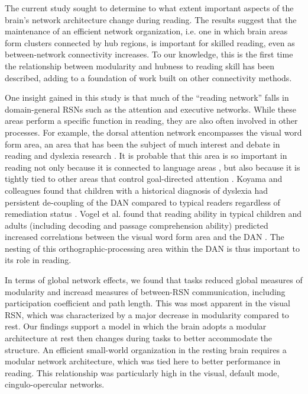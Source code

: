 The current study sought to determine to what extent important aspects of the brain's network architecture change during reading. The results suggest that the maintenance of an efficient network organization, i.e. one in which brain areas form clusters connected by hub regions, is important for skilled reading, even as between-network connectivity increases. To our knowledge, this is the first time the relationship between modularity and hubness to reading skill has been described, adding to a foundation of work built on other connectivity methods.

One insight gained in this study is that much of the ``reading network'' falls in domain-general RSNs such as the attention and executive networks. While these areas perform a specific function in reading, they are also often involved in other processes. For example, the dorsal attention network encompasses the visual word form area, an area that has been the subject of much interest and debate in reading and dyslexia research \citep{McCandliss2003}. It is probable that this area is so important in reading not only because it is connected to language areas \citep{Bouhali2014}, but also because it is tightly tied to other areas that control goal-directed attention \citep{Vogel2014}. Koyama and colleagues found that children with a historical diagnosis of dyslexia had persistent de-coupling of the DAN compared to typical readers regardless of remediation status \citep{Koyama2013}. Vogel et al. found that reading ability in typical children and adults (including decoding and passage comprehension ability) predicted increased correlations between the visual word form area and the DAN \citep{Vogel2012a}. The nesting of this orthographic-processing area within the DAN is thus important to its role in reading.

In terms of global network effects, we found that tasks reduced global measures of modularity and increasd measures of between-RSN communication, including participation coefficient and path length. This was most apparent in the visual RSN, which was characterized by a major decrease in modularity compared to rest. Our findings support a model in which the brain adopts a modular architecture at rest then changes during tasks to better accommodate the structure. An efficient small-world organization in the resting brain requires a modular network architecture, which was tied here to better performance in reading. This relationship was particularly high in the visual, default mode, cingulo-opercular networks. 

